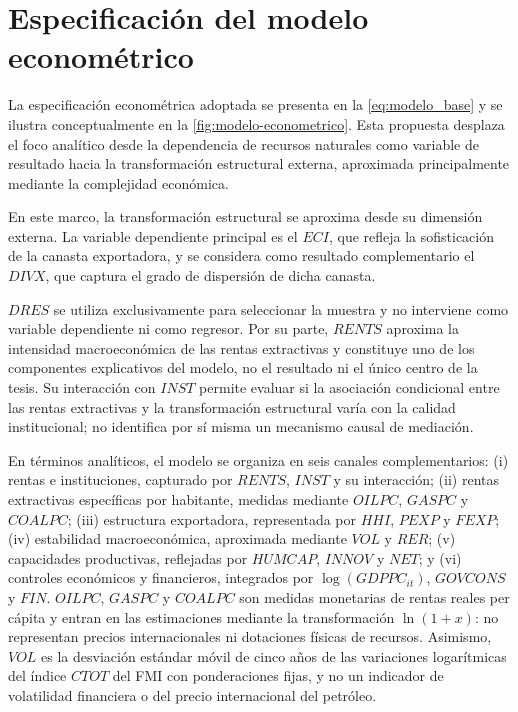 \documentclass[../../TFM.tex]{subfiles}
\begin{document}
	\section{Especificación del modelo econométrico}
	\label{sec:modelo-econometrico}


	La especificación econométrica adoptada se presenta en la \autoref{eq:modelo_base} y se ilustra conceptualmente en la \autoref{fig:modelo-econometrico}. Esta propuesta desplaza el foco analítico desde la dependencia de recursos naturales como variable de resultado hacia la transformación estructural externa, aproximada principalmente mediante la complejidad económica.

	En este marco, la transformación estructural se aproxima desde su dimensión externa. La variable dependiente principal es el $ECI$, que refleja la sofisticación de la canasta exportadora, y se considera como resultado complementario el $DIVX$, que captura el grado de dispersión de dicha canasta.

	$DRES$ se utiliza exclusivamente para seleccionar la muestra y no interviene
	como variable dependiente ni como regresor. Por su parte, $RENTS$ aproxima la
	intensidad macroeconómica de las rentas extractivas y constituye uno de los
	componentes explicativos del modelo, no el resultado ni el único centro de la
	tesis. Su interacción con $INST$ permite evaluar si la asociación condicional
	entre las rentas extractivas y la transformación estructural varía con la
	calidad institucional; no identifica por sí misma un mecanismo causal de
	mediación.

	En términos analíticos, el modelo se organiza en seis canales complementarios:
	(i) rentas e instituciones, capturado por $RENTS$, $INST$ y su interacción;
	(ii) rentas extractivas específicas por habitante, medidas mediante $OILPC$,
	$GASPC$ y $COALPC$; (iii) estructura exportadora, representada por $HHI$,
	$PEXP$ y $FEXP$; (iv) estabilidad macroeconómica, aproximada mediante $VOL$ y
	$RER$; (v) capacidades productivas, reflejadas por $HUMCAP$, $INNOV$ y $NET$;
	y (vi) controles económicos y financieros, integrados por
	$\log(GDPPC_{it})$, $GOVCONS$ y $FIN$. $OILPC$, $GASPC$ y $COALPC$ son
	medidas monetarias de rentas reales per cápita y entran en las estimaciones
	mediante la transformación $\ln(1+x)$: no representan precios
	internacionales ni dotaciones físicas de recursos. Asimismo, $VOL$ es la
	desviación estándar móvil de cinco años de las variaciones logarítmicas del
	índice $CTOT$ del FMI con ponderaciones fijas, y no un indicador de volatilidad
	financiera o del precio internacional del petróleo.
\end{document}
